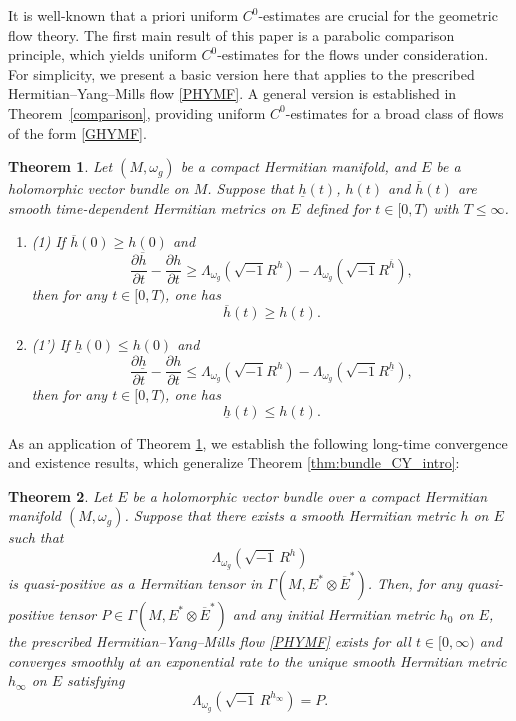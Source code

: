 \documentclass[12pt, reqno]{amsart}
\theoremstyle{plain}
\newtheorem{thm}{Theorem}[section]
\theoremstyle{definition}
\newcommand{\btheorem}{\begin{thm}}
\newcommand{\etheorem}{\end{thm}}
\newcommand{\p}{\partial}
\renewcommand{\bar}{\overline}
\newcommand{\beq}{\begin{equation}}
\newcommand{\eeq}{\end{equation}}
\newcommand{\bd}{\begin{enumerate}}
\newcommand{\ed}{\end{enumerate}}
\renewcommand{\>}{\rightarrow}
\renewcommand{\>}{\rightarrow}
\renewcommand{\p}{{\partial}}
\newcommand{\om}{\omega}
\renewcommand{\bar}{\overline}
\numberwithin{equation}{section} %
\begin{document}
\noindent
It is well-known that  a priori uniform $C^0$-estimates are crucial for the  geometric flow theory. The first main result of this paper is a parabolic comparison principle, which yields uniform $C^0$-estimates for the flows under consideration. For simplicity, we present a basic version here that applies to the prescribed Hermitian--Yang--Mills flow \eqref{PHYMF}. A general version is established in Theorem~\ref{comparison}, providing uniform $C^0$-estimates for a broad class of flows of the form \eqref{GHYMF}.


    \btheorem\label{main2} Let $(M,\om_g)$ be a compact Hermitian manifold, and  $E$ be a holomorphic vector bundle on $M$. Suppose that $\underline h(t)$,   $h(t)$ and $\overline h(t)$ are smooth time-dependent Hermitian metrics on $E$ defined for $t\in [0,T)$ with $T\leq \infty$.  \bd \item[(1)]  If  $\overline h(0)\geq h(0)$ and
    \beq \frac{\p \overline h}{\p t}-\frac{\p h}{\p t}
    \geq \Lambda_{\omega_g}\left(\sqrt{-1} R^h\right)-\Lambda_{\omega_g}\left(\sqrt{-1} R^{\overline h}\right),\eeq
    then for any $t\in [0, T)$, one has \beq \overline h(t)\geq h(t).\eeq
    \item[(1')] If  $ \underline h(0)\leq h(0)$ and
    \beq \frac{\p \underline h}{\p t}-\frac{\p h}{\p t}
    \leq \Lambda_{\omega_g}\left(\sqrt{-1} R^h\right)-\Lambda_{\omega_g}\left(\sqrt{-1} R^{\underline h}\right),\eeq
    then for any $t\in [0, T)$, one has \beq  \underline h(t)\leq h(t).\eeq
    \ed

    \etheorem

\noindent As an application of Theorem \ref{main2}, we establish the following long-time convergence and existence results, which generalize Theorem \ref{thm:bundle_CY_intro}:


\btheorem\label{main3}Let $E$ be a holomorphic vector bundle over a compact Hermitian manifold $(M, \omega_g)$. Suppose that there exists a smooth Hermitian metric $h$ on $E$ such that $$
\Lambda_{\omega_g}\left(\sqrt{-1}\, R^{h}\right) $$ is quasi-positive as a Hermitian tensor in $\Gamma(M, E^* \otimes \bar{E}^*)$.
Then, for any quasi-positive tensor $P \in \Gamma(M, E^* \otimes \bar{E}^*)$ and any initial Hermitian metric $h_0$ on $E$, the prescribed Hermitian--Yang--Mills flow \eqref{PHYMF} exists for all $t\in [0,\infty)$ and converges smoothly at an exponential rate  to the \emph{unique} smooth Hermitian metric $h_\infty$ on $E$ satisfying
\begin{equation}
\Lambda_{\omega_g}\left(\sqrt{-1}\, R^{h_\infty}\right) = P.\label{PHYMinfty}
\end{equation}
\etheorem
\end{document}
